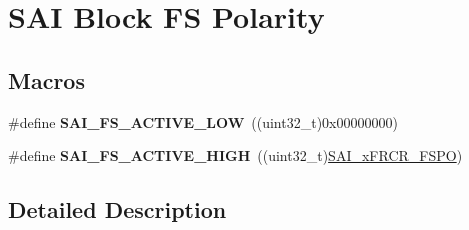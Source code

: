\hypertarget{group___s_a_i___block___f_s___polarity}{}\section{S\+AI Block FS Polarity}
\label{group___s_a_i___block___f_s___polarity}
\subsection*{Macros}
\begin{DoxyCompactItemize}
\item 
\#define {\bfseries S\+A\+I\+\_\+\+F\+S\+\_\+\+A\+C\+T\+I\+V\+E\+\_\+\+L\+OW}~((uint32\+\_\+t)0x00000000)\hypertarget{group___s_a_i___block___f_s___polarity_ga1810acd8ad52236aa2241505f0b798ea}{}\label{group___s_a_i___block___f_s___polarity_ga1810acd8ad52236aa2241505f0b798ea}

\item 
\#define {\bfseries S\+A\+I\+\_\+\+F\+S\+\_\+\+A\+C\+T\+I\+V\+E\+\_\+\+H\+I\+GH}~((uint32\+\_\+t)\hyperlink{group___peripheral___registers___bits___definition_ga25a91a67abdf0da4d675611ec50a06d0}{S\+A\+I\+\_\+x\+F\+R\+C\+R\+\_\+\+F\+S\+PO})\hypertarget{group___s_a_i___block___f_s___polarity_ga3447ef6bf9a53f7929347ead1b7b0542}{}\label{group___s_a_i___block___f_s___polarity_ga3447ef6bf9a53f7929347ead1b7b0542}

\end{DoxyCompactItemize}


\subsection{Detailed Description}
